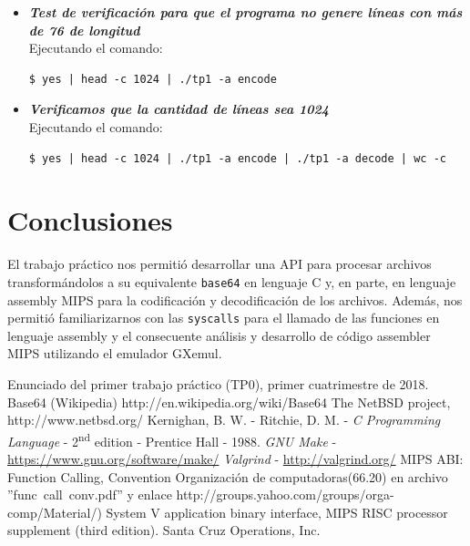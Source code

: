 \documentclass[11pt,a4paper]{article}
\begin{document}
\begin{itemize}
\newpage
	\item \textit{\textbf{Test de verificación para que el programa no genere líneas con más de 76 de longitud}} \\
	Ejecutando el comando:
	\begin{lstlisting}
$ yes | head -c 1024 | ./tp1 -a encode
	\end{lstlisting}  
 
	

	\item \textit{\textbf{Verificamos que la cantidad de líneas sea 1024}}\\
	Ejecutando el comando:
	\begin{lstlisting}
$ yes | head -c 1024 | ./tp1 -a encode | ./tp1 -a decode | wc -c
	\end{lstlisting}  


	\end{itemize}


\newpage

\section{Conclusiones}

El trabajo práctico nos permitió desarrollar una API para procesar archivos transformándolos a su equivalente \texttt{base64} en lenguaje C y, en parte, en lenguaje assembly MIPS para la codificación y decodificación de los archivos. Además, nos permitió familiarizarnos con las \texttt{syscalls} para el llamado de las funciones en lenguaje assembly y el consecuente análisis y desarrollo de código assembler MIPS utilizando el emulador GXemul.


\begin{thebibliography}{10}
	\bibitem{}Enunciado del primer trabajo práctico (TP0), primer cuatrimestre de 2018.
	\bibitem{}Base64 (Wikipedia) http://en.wikipedia.org/wiki/Base64
	\bibitem{}The NetBSD project, http://www.netbsd.org/
	 Kernighan, B. W. - Ritchie, D. M. - \emph{C Programming Language} - 2\textsuperscript{nd} edition - Prentice Hall - 1988.
	 \emph{GNU Make} - \hyperlink{make}{https://www.gnu.org/software/make/}
	 \emph{Valgrind} - \hyperlink{valgrind}{http://valgrind.org/}
	\bibitem{}MIPS ABI: Function Calling, Convention Organización de computadoras(66.20) en archivo ''func\ call\ conv.pdf'' y enlace http://groups.yahoo.com/groups/orga-comp/Material/)
	\bibitem{}System V application binary interface, MIPS RISC processor supplement
(third edition). Santa Cruz Operations, Inc.
\end{thebibliography}
\newpage
\appendix
\end{document}
